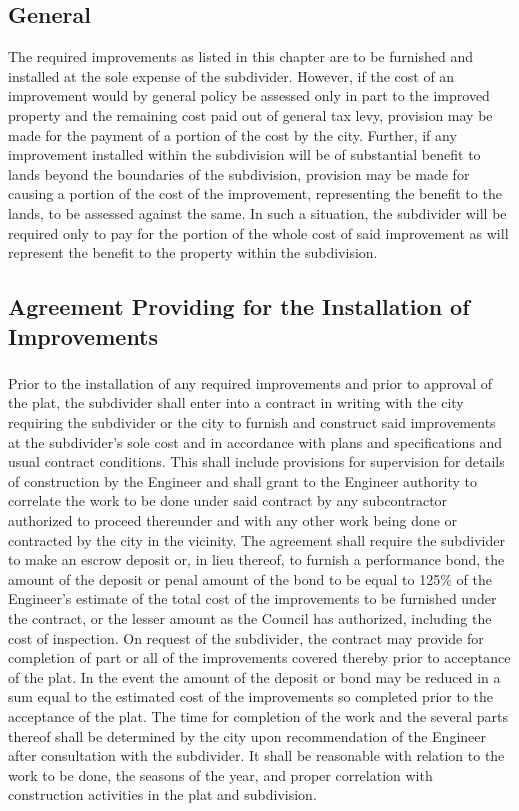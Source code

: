 \subsection{General}
The required improvements as listed in this chapter are to be furnished and installed at the sole expense of the subdivider. However, if the cost of an improvement would by general policy be assessed only in part to the improved property and the remaining cost paid out of general tax levy, provision may be made for the payment of a portion of the cost by the city. Further, if any improvement installed within the subdivision will be of substantial benefit to lands beyond the boundaries of the subdivision, provision may be made for causing a portion of the cost of the improvement, representing the benefit to the lands, to be assessed against the same. In such a situation, the subdivider will be required only to pay for the portion of the whole cost of said improvement as will represent the benefit to the property within the subdivision.
\subsection{Agreement Providing for the Installation of Improvements}
\subsubsection{}
Prior to the installation of any required improvements and prior to approval of the plat, the subdivider shall enter into a contract in writing with the city requiring the subdivider or the city to furnish and construct said improvements at the subdivider’s sole cost and in accordance with plans and specifications and usual contract conditions. This shall include provisions for supervision for details of construction by the Engineer and shall grant to the Engineer authority to correlate the work to be done under said contract by any subcontractor authorized to proceed thereunder and with any other work being done or contracted by the city in the vicinity. The agreement shall require the subdivider to make an escrow deposit or, in lieu thereof, to furnish a performance bond, the amount of the deposit or penal amount of the bond to be equal to 125\% of the Engineer’s estimate of the total cost of the improvements to be furnished under the contract, or the lesser amount as the Council has authorized, including the cost of inspection. On request of the subdivider, the contract may provide for completion of part or all of the improvements covered thereby prior to acceptance of the plat. In the event the amount of the deposit or bond may be reduced in a sum equal to the estimated cost of the improvements so completed prior to the acceptance of the plat. The time for completion of the work and the several parts thereof shall be determined by the city upon recommendation of the Engineer after consultation with the subdivider. It shall be reasonable with relation to the work to be done, the seasons of the year, and proper correlation with construction activities in the plat and subdivision.
